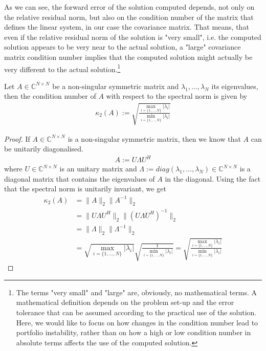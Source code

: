 		As we can see, the forward error of the solution computed depends, not only on the relative residual norm, but also on the condition number of the matrix that defines the linear system, in our case the covariance matrix. That means, that even if the relative residual norm of the solution is "very small", i.e. the computed solution appears to be very near to the actual solution, a "large" covariance matrix condition number implies that the computed solution might actually be very different to the actual solution.\footnote{The terms "very small" and "large" are, obviously, no mathematical terms. A mathematical definition depends on the problem set-up and the error tolerance that can be assumed according to the practical use of the solution. Here, we would like to focus on how changes in the condition number lead to portfolio instability, rather than on how a high or low condition number in absolute terms affects the use of the computed solution.}
		
		\begin{theorem}\label{condtionnumbereigenvaluetheorem}
		    Let $A \in \mathbb{C}^{N \times N}$ be a non-singular symmetric matrix and $\lambda_1, \dots, \lambda_N$ its eigenvalues, then the condition number of $A$ with respect to the spectral norm is given by
		    \begin{align*}
		        \kappa_2(A) := \sqrt{\frac{\max_{i = \{1, \dots, N \} } | \lambda_i |}{\min_{i = \{1, \dots, N \} } | \lambda_i |}}
		    \end{align*}
		\end{theorem}
		
		\begin{proof}
		    If $A \in \mathbb{C}^{N \times N}$ is a non-singular symmetric matrix, then we know that $A$ can be unitarily diagonalised.
		    \begin{align*}
		        A := U \Lambda U^H
		    \end{align*}
		    where $U \in \mathbb{C}^{N \times N}$ is an unitary matrix and $\Lambda := diag(\lambda_1, \dots, \lambda_N) \in \mathbb{C}^{N \times N}$ is a diagonal matrix that contains the eigenvalues of $A$ in the diagonal. Using the fact that the spectral norm is unitarily invariant, we get
		    \begin{align*}
		        \kappa_2(A) &= \| A \|_2 \| A^{-1} \|_2 \\
		        &= \| U \Lambda U^H \|_2 \| (U \Lambda U^H)^{-1} \|_2 \\
		        &= \| \Lambda \|_2 \| \Lambda^{-1} \|_2 \\
		        &= \sqrt{\max_{i = \{1, \dots, N \} } | \lambda_i |} \sqrt{\frac{1}{\min_{i = \{1, \dots, N \} } | \lambda_i |}} = \sqrt{\frac{\max_{i = \{1, \dots, N \} } | \lambda_i |}{\min_{i = \{1, \dots, N \} } | \lambda_i |}}
		    \end{align*}
		\end{proof}
		
